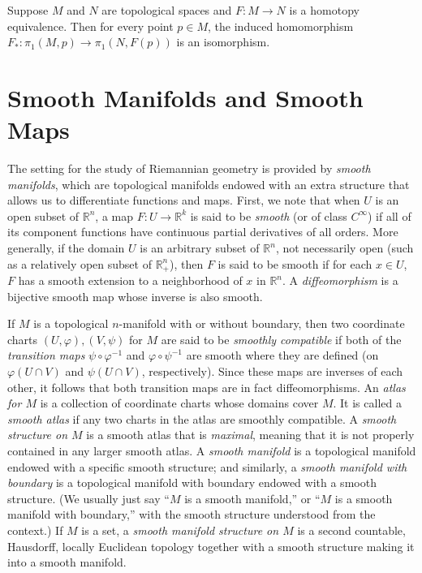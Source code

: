 \begin{proposition}
\label{prop:homotopy-invariance-fundamental-group}

Suppose $M$ and $N$ are topological spaces and $F: M \to N$ is a
homotopy equivalence. Then for every point $p \in M$, the induced homomorphism
$F_*: \pi_1(M, p) \to \pi_1(N, F(p))$ is an isomorphism.
\end{proposition}

\section{Smooth Manifolds and Smooth Maps}

The setting for the study of Riemannian geometry is provided by \emph{smooth manifolds}, which are topological manifolds endowed with an extra structure that allows us to differentiate functions and maps. First, we note that when $U$ is an open subset of $\mathbb{R}^n$, a map $F : U \to \mathbb{R}^k$ is said to be \emph{smooth} (or of class $C^\infty$) if all of its component functions have continuous partial derivatives of all orders. More generally, if the domain $U$ is an arbitrary subset of $\mathbb{R}^n$, not necessarily open (such as a relatively open subset of $\mathbb{R}^n_+$), then $F$ is said to be smooth if for each $x \in U$, $F$ has a smooth extension to a neighborhood of $x$ in $\mathbb{R}^n$. A \emph{diffeomorphism} is a bijective smooth map whose inverse is also smooth.

If $M$ is a topological $n$-manifold with or without boundary, then two coordinate charts $(U, \varphi), (V, \psi)$ for $M$ are said to be \emph{smoothly compatible} if both of the \emph{transition maps} $\psi \circ \varphi^{-1}$ and $\varphi \circ \psi^{-1}$ are smooth where they are defined (on $\varphi(U \cap V)$ and $\psi(U \cap V)$, respectively). Since these maps are inverses of each other, it follows that both transition maps are in fact diffeomorphisms. An \emph{atlas for $M$} is a collection of coordinate charts whose domains cover $M$. It is called a \emph{smooth atlas} if any two charts in the atlas are smoothly compatible. A \emph{smooth structure on $M$} is a smooth atlas that is \emph{maximal}, meaning that it is not properly contained in any larger smooth atlas. A \emph{smooth manifold} is a topological manifold endowed with a specific smooth structure; and similarly, a \emph{smooth manifold with boundary} is a topological manifold with boundary endowed with a smooth structure. (We usually just say ``$M$ is a smooth manifold,'' or ``$M$ is a smooth manifold with boundary,'' with the smooth structure understood from the context.) If $M$ is a set, a \emph{smooth manifold structure on $M$} is a second countable, Hausdorff, locally Euclidean topology together with a smooth structure making it into a smooth manifold.

